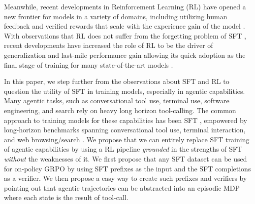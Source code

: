 Meanwhile, recent developments in Reinforcement Learning (RL) \citep{sutton1998reinforcement} have opened a new frontier for models in a variety of domains, including utilizing human feedback \citep{ouyang2022instructgpt} and verified rewards \citep{shao2024deepseekmath,Guo_2025} that scale with the experience gain of the model \citep{silver2025era}. With observations that RL does not suffer from the forgetting problem of SFT \citep{lu2025onpolicydistillation,shenfeld2025rlsrazoronlinereinforcement,chen2025retainingdoingroleonpolicy,chu2025sftmemorizesrlgeneralizes}, recent developments have increased the role of RL to be the driver of generalization and last-mile performance gain allowing its quick adoption as the final stage of training for many state-of-the-art models \citep{Guo_2025,qwen3technicalreport,kimiteam2025kimik2openagentic,5team2025glm45agenticreasoningcoding}.

In this paper, we step further from the observations about SFT and RL to question the utility of SFT in training models, especially in agentic capabilities. Many agentic tasks, such as conversational tool use, terminal use, software engineering, and search rely on heavy long horizon tool-calling. The common approach to training models for these capabilities has been SFT \citep{prabhakar2025apigenmtagenticpipelinemultiturn,qin2023toollLM,xu2023toolbench,liu2025toolacewinningpointsllm,pan2025trainingsoftwareengineeringagents,nakano2021webgpt}, empowered by long-horizon benchmarks spanning conversational tool use, terminal interaction, and web browsing/search \citep{yao2024taubench,barres2025tau2bench,tbench_2025,wei2025browsecompsimplechallengingbenchmark}. We propose that we can entirely replace SFT training of agentic capabilities by using a RL pipeline \textit{grounded} in the strengths of SFT \textit{without} the weaknesses of it. We first propose that any SFT dataset can be used for on-policy GRPO by using SFT prefixes as the input and the SFT completions as a verifier. We then propose a easy way to create such prefixes and verifiers by pointing out that agentic trajectories can be abstracted into an episodic MDP where each state is the result of tool-call.

